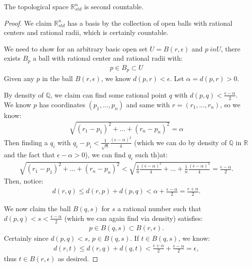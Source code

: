 \documentclass[12pt,letterpaper,reqno]{article}
\begin{document}
\begin{theorem}\label{property:rn-std-second-countable}
    The topological space $\mathbb{R}^{n}_{std}$ is second countable. 
\end{theorem}

\begin{proof}
    We claim $\mathbb{R}_{std}^{n}$ has a basis by the collection of open balls with rational centers and rational radii, which is certainly countable.

    We need to show for an arbitrary basic open set $U = B(r, \epsilon)$ and $p\ in U$, there exists $B_p$ a ball with rational center and rational radii with:
    \begin{align*}
        p \in B_p \subset U  
    \end{align*}
    Given any $p$ in the ball $B(r, \epsilon)$, we know $d(p, r) < \epsilon$. Let $\alpha = d(p, r) > 0$. 
    
    By density of $\mathbb{Q}$, we claim can find some rational point $q$ with $d(p, q) < \frac{\epsilon - \alpha}{2}$. We know $p$ has coordinates $(p_1, ..., p_n)$ and same with $r = (r_1, ..., r_n)$, so we know:
    \begin{align*}
        \sqrt{(r_1-p_1)^2 + ... + (r_n-p_n)^2} = \alpha
    \end{align*}
    Then finding a $q_i$ with $q_i - p_i < \frac{1}{\sqrt{n}} \frac{(\epsilon - \alpha)^2}{4}$ (which we can do by density of $\mathbb{Q}$ in $\mathbb{R}$ and the fact that $\epsilon - \alpha > 0$), we can find $q_i$ such th)at:
    \begin{align*}
        \sqrt{(r_1-p_1)^2 + ... + (r_n-p_n)^2} < \sqrt{\frac{1}{n}\frac{(\epsilon - \alpha)^2}{4} + ... + \frac{1}{n}\frac{(\epsilon - \alpha)^2}{4}} = \frac{\epsilon - \alpha}{2}.
    \end{align*}
    Then, notice:
    \begin{align*}
        d(r, q) \le d(r, p) + d(p, q) < \alpha + \frac{\epsilon - \alpha}{2} = \frac{\epsilon + \alpha}{2}. 
    \end{align*}

    We now claim the ball $B(q, s)$ for $s$ a rational number such that $d(p, q) < s < \frac{\epsilon - \alpha}{2}$ (which we can again find via density) satisfies:
    \begin{align*}
        p \in B(q, s) \subset B(r, \epsilon).
    \end{align*}
    Certainly since $d(p, q) < s$, $p \in B(q, s)$. If $t \in B(q, s)$, we know:
    \begin{align*}
        d(r, t) \le d(r, q) + d(q, t) < \frac{\epsilon + \alpha}{2} + \frac{\epsilon-\alpha}{2} = \epsilon,
    \end{align*}
    thus $t \in B(r, \epsilon)$ as desired.
\end{proof}
\end{document}
